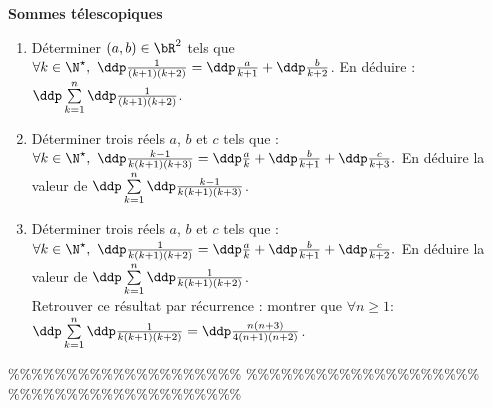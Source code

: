 



\begin{exercice}  \; \textbf{Sommes t\'elescopiques}
\begin{enumerate}
\item D\'eterminer $(a,b)\in\bR^2$ tels que $\forall k\in\N^{\star}, \ \ddp\frac{1}{(k+1)(k+2)}=\ddp\frac{a}{k+1}+\ddp\frac{b}{k+2}$. En d\'eduire : $\ddp \sum\limits_{k=1}^n \ddp\frac{1}{(k+1)(k+2)} $. 
\item D\'eterminer trois r\'eels $a$, $b$ et $c$ tels que : $\forall k\in\N^{\star},\ \ddp\frac{k-1}{k(k+1)(k+3)}=\ddp\frac{a}{k}+\ddp\frac{b}{k+1}+\ddp\frac{c}{k+3}.$ En d\'eduire la valeur de $\ddp \sum\limits_{k=1}^{n}  \ddp\frac{k-1}{k(k+1)(k+3)}$.
\item D\'eterminer trois r\'eels $a$, $b$ et $c$ tels que : $\forall k\in\N^{\star},\ \ddp\frac{1}{k(k+1)(k+2)}=\ddp\frac{a}{k}+\ddp\frac{b}{k+1}+\ddp\frac{c}{k+2}.$ En d\'eduire la valeur de $\ddp \sum\limits_{k=1}^{n}  \ddp\frac{1}{k(k+1)(k+2)}$.\\
Retrouver ce r\'esultat par r\'ecurrence : montrer que $\forall n\geq 1$: $\ddp \sum\limits_{k=1}^{n} \ddp\frac{1}{k(k+1)(k+2)}=\ddp\frac{n(n+3)}{4(n+1)(n+2)}$.
\end{enumerate}
\end{exercice}


\%\%\%\%\%\%\%\%\%\%\%\%\%\%\%\%\%\%\%\%
\%\%\%\%\%\%\%\%\%\%\%\%\%\%\%\%\%\%\%\%
\%\%\%\%\%\%\%\%\%\%\%\%\%\%\%\%\%\%\%\%




